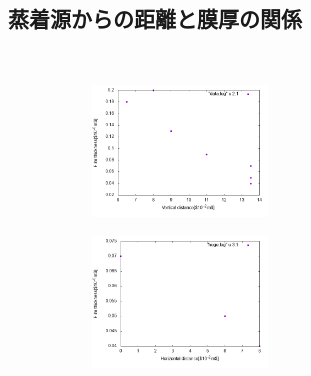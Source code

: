 \documentclass{jsarticle}
\begin{document}
\subsection{蒸着源からの距離と膜厚の関係}
\ 
\begin{figure}[htbp]
 \begin{minipage}{0.5\hsize}
  \begin{center}
   \includegraphics[width=70mm,height=35mm]{pictures/graph01.png}
  \end{center}
  \label{fig:one}
 \end{minipage}
 \begin{minipage}{0.5\hsize}
  \begin{center}
   \includegraphics[width=70mm,height=35mm]{pictures/graph02.png}
  \end{center}
  \label{fig:two}
 \end{minipage}
\end{figure}
\end{document}
